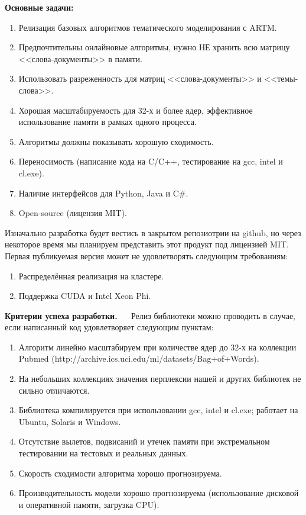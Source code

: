 \documentclass[12pt]{article}
\begin{document}
{\bf Основные задачи:}
\begin{enumerate}
	\item Релизация базовых алгоритмов тематического моделирования с ARTM.
	\item Предпочтительны онлайновые алгоритмы, нужно НЕ хранить всю матрицу <<слова-документы>> в памяти.
	\item Использовать разреженность для матриц <<слова-документы>> и <<темы-слова>>.
	\item Хорошая масштабируемость для 32-х и более ядер, эффективное использование памяти в рамках одного процесса.
	\item Алгоритмы должны показывать хорошую сходимость.
	\item Переносимость (написание кода на C/C++, тестирование на gcc, intel и cl.exe).
	\item Наличие интерфейсов для Python, Java и C\#.
	\item Open-source (лицензия MIT). 
\end{enumerate}

Изначально разработка будет вестись в закрытом репозиотрии на github, но через некоторое время мы планируем представить этот продукт под лицензией MIT. Первая публикуемая версия может не удовлетворять следующим требованиям:
\begin{enumerate}
	\item Распределённая реализация на кластере.
	\item Поддержка CUDA и Intel Xeon Phi.
\end{enumerate} 

{\bf Критерии успеха разработки.} $\quad$ Релиз библиотеки можно проводить в случае, если написанный код удовлетворяет следующим пунктам:
\begin{enumerate}
	\item Алгоритм линейно масштабируем при количестве ядер до 32-х на коллекции Pubmed (http://archive.ics.uci.edu/ml/datasets/Bag+of+Words).
	\item На небольших коллекциях значения перплексии нашей и других библиотек не сильно отличаются.
	\item Библиотека компилируется при использовании gcc, intel и cl.exe; работает на Ubuntu, Solaris и Windows.
	\item Отсутствие вылетов, подвисаний и утечек памяти при экстремальном тестировании на тестовых и реальных данных. 
	\item Скорость сходимости алгоритма хорошо прогнозируема.
	\item Производительность модели хорошо прогнозируема (использование дисковой и оперативной памяти, загрузка CPU). 
\end{enumerate}
\end{document}
